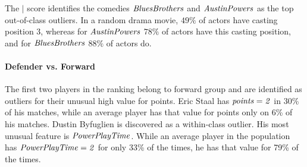 {							%
							The  $\mid$ score identifies the comedies  $\it{Blues Brothers}$ and $\it{Austin Powers}$ as the top out-of-class outliers. 
							In a random drama movie,  $49\%$ of actors have casting position 3, whereas for $\it{Austin Powers}$ $78\%$ of actors have this casting position, and for $\it{Blues Brothers}$ $88\%$ of actors do. 
     						\paragraph{Defender vs. Forward}
     						The first two players in the ranking belong to forward group and are identified as outliers for their unusual high value for points. Eric Staal has $\it{points=2}$ in 30\% of his matches, while an average player has that value for points only on 6\% of his matches. Dustin Byfuglien is discovered as a within-class outlier. His most unusual feature is $\it{Power Play Time}$. While an average player in the population has  $\it{Power Play Time=2}$ for only 33\% of the times, he has that value for 79\% of the times.
}
